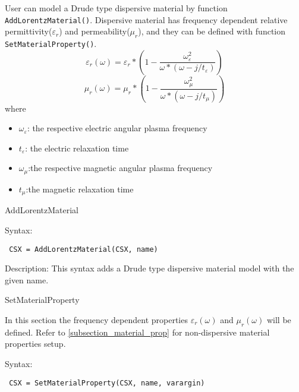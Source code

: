 User can model a Drude type dispersive material by function \texttt{AddLorentzMaterial()}. Dispersive material has frequency dependent relative permittivity($\varepsilon_{r}$) and permeability($\mu_{r}$), and they can be defined with function \texttt{ SetMaterialProperty()}.
\begin{equation}
\varepsilon_{r}(\omega)=\varepsilon_{r}*(1-\dfrac{\omega_{\varepsilon}^2}{\omega*(\omega-j/t_{\varepsilon})})
\end{equation}
\begin{equation}
\mu_{r}(\omega)=\mu_{r}*(1-\dfrac{\omega_{\mu}^2}{\omega*(\omega-j/t_{\mu})})
\end{equation}
where \begin{myindentpar}
\begin{itemize}
\item $\omega_{\varepsilon}$: the respective electric angular plasma frequency
\item $t_{\varepsilon}$: the electric relaxation time 
\item $\omega_{\mu}$:the respective magnetic angular plasma frequency
\item $t_{\mu}$:the magnetic relaxation time
\end{itemize}
\end{myindentpar}

\begin{FontNameFunct}{AddLorentzMaterial}
\end{FontNameFunct}

\begin{FontDescr}{Syntax:}
  \begin{lstlisting}
 CSX = AddLorentzMaterial(CSX, name)
  \end{lstlisting}
\end{FontDescr}

\begin{FontDescr}{Description:}
  This syntax adds a Drude type dispersive material model with the given name.\\ 
\end{FontDescr} 
  

\begin{FontNameFunct}{SetMaterialProperty}  
\end{FontNameFunct}
In this section the frequency dependent properties $\varepsilon_{r}(\omega)$ and $\mu_{r}(\omega)$ will be defined. Refer to \ref{subsection_material_prop} for non-dispersive material properties setup. 

 \begin{FontDescr}{Syntax:}
  \begin{lstlisting}
 CSX = SetMaterialProperty(CSX, name, varargin)
  \end{lstlisting}
 \end{FontDescr}
 

